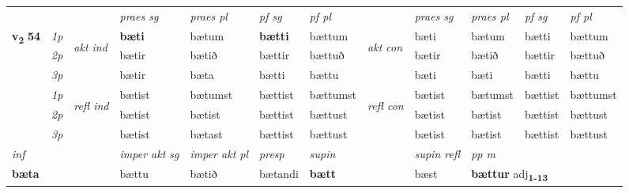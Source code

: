 \begin{longtable}[l]{X>{\footnotesize\itshape}llXXXXlXXXX}
\midrule

 & &   & \textit{praes sg}  & \textit{praes pl}    & \textit{ pf sg} & \textit{pf pl} & & \textit{praes sg}  & \textit{praes pl}    & \textit{pf sg} & \textit{pf pl }  \\ \cmidrule{4-7} \cmidrule{9-12}
 \multirow{2}{*}{{{\textbf{v{\textsubscript{2}}} \Large{\textbf{54}}}}}  & 1p & \multirow{3}{*}{\begin{turn}{90}\textit{akt ind}\end{turn}} & \textbf{bæti} & bætum & \textbf{bætti} & bættum & \multirow{3}{*}{\begin{turn}{90}\textit{akt con}\end{turn}} &bæti & bætum & bætti & bættum\\*
 & 2p &  &  bætir  & bætið & bættir & bættuð & & bætir & bætið & bættir & bættuð \\*
 & 3p &  & bætir & bæta & bætti & bættu & & bæti & bæti& bætti & bættu \\*
\cmidrule{4-7} \cmidrule{9-12}
 & 1p & \multirow{3}{*}{\begin{turn}{90}\textit{refl ind}\end{turn}}  & bætist & bætumst & bættist & bættumst & \multirow{3}{*}{\begin{turn}{90}\textit{refl con}\end{turn}}  &bætist & bætumst & bættist & bættumst \\*
 & 2p &  & bætist & bætist & bættist & bættust & &bætist & bætist & bættist & bættust \\*
 & 3p  & & bætist & bætast & bættist & bættust & & bætist & bætist& bættist & bættust \\*
\cmidrule{4-7} \cmidrule{9-12}

   {\textit{inf}} & &  & \textit{imper akt sg} & \textit{imper akt pl}   & \textit{presp} & \textit{supin} && \textit{supin refl} & \textit{pp m} \\*
  {\textbf{bæta}} & && bættu  & bætið   & bætandi &  \textbf{bætt} && bæst & \multicolumn{2}{l}{\textbf{bættur} adj\textbf{\textsubscript{1-13}}} \\*

\midrule


\end{longtable}
